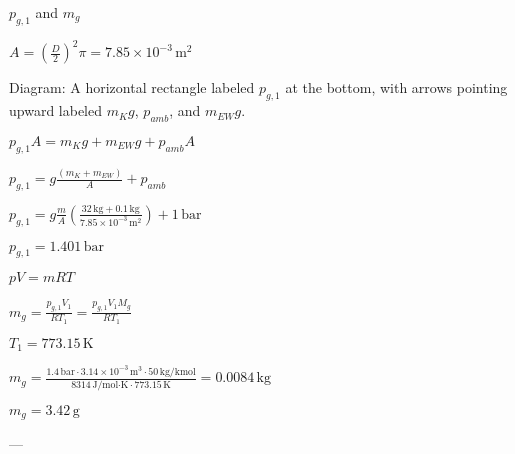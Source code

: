 \( p_{g,1} \) and \( m_g \)  

\( A = \left( \frac{D}{2} \right)^2 \pi = 7.85 \times 10^{-3} \, \text{m}^2 \)  

Diagram: A horizontal rectangle labeled \( p_{g,1} \) at the bottom, with arrows pointing upward labeled \( m_K g \), \( p_{amb} \), and \( m_{EW} g \).  

\( p_{g,1} A = m_K g + m_{EW} g + p_{amb} A \)  

\( p_{g,1} = g \frac{(m_K + m_{EW})}{A} + p_{amb} \)  

\( p_{g,1} = g \frac{m}{A} \left( \frac{32 \, \text{kg} + 0.1 \, \text{kg}}{7.85 \times 10^{-3} \, \text{m}^2} \right) + 1 \, \text{bar} \)  

\( p_{g,1} = 1.401 \, \text{bar} \)  

\( pV = mRT \)  

\( m_g = \frac{p_{g,1} V_1}{R T_1} = \frac{p_{g,1} V_1 M_g}{R T_1} \)  

\( T_1 = 773.15 \, \text{K} \)  

\( m_g = \frac{1.4 \, \text{bar} \cdot 3.14 \times 10^{-3} \, \text{m}^3 \cdot 50 \, \text{kg/kmol}}{8314 \, \text{J/mol·K} \cdot 773.15 \, \text{K}} = 0.0084 \, \text{kg} \)  

\( m_g = 3.42 \, \text{g} \)  

---